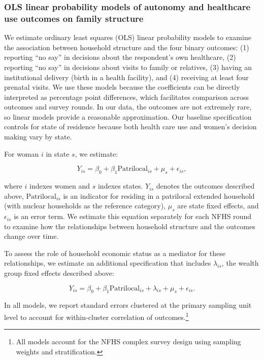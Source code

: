\documentclass[10pt,twoside,reqno]{article}
\begin{document}
\subsubsection*{OLS linear probability models of autonomy and healthcare use outcomes on family structure}

We estimate ordinary least squares (OLS) linear probability models to examine the association between household structure and the four binary outcomes: (1) reporting ``no say'' in decisions about the respondent's own healthcare, (2) reporting ``no say'' in decisions about visits to family or relatives, (3) having an institutional delivery (birth in a health facility), and (4) receiving at least four prenatal visits. We use these models because the coefficients can be directly interpreted as percentage point differences, which facilitates comparison across outcomes and survey rounds. In our data, the outcomes are not extremely rare, so linear models provide a reasonable approximation.  Our baseline specification controls for state of residence because both health care use and women's decision making vary by state.  

For woman $i$ in state $s$, we estimate:

\begin{equation} \label{eq:nocontrols}
Y_{is} = \beta_0 + \beta_1 \text{Patrilocal}_{is} + \mu_s + \epsilon_{is},
\end{equation}

where $i$ indexes women and $s$ indexes states. $Y_{is}$ denotes the outcomes described above, $\text{Patrilocal}_{is}$ is an indicator for residing in a patrilocal extended household (with nuclear households as the reference category), $\mu_s$ are state fixed effects, and $\epsilon_{is}$ is an error term. We estimate this equation separately for each NFHS round to examine how the relationships between household structure and the outcomes change over time.

To assess the role of household economic status as a mediator for these relationships, we estimate an additional specification that includes $\lambda_{is}$, the wealth group fixed effects described above:

\begin{equation} \label{eq:controls}
Y_{is} = \beta_0 + \beta_1 \text{Patrilocal}_{is} + \lambda_{is} + \mu_s + \epsilon_{is}.
\end{equation}

In all models, we report standard errors clustered at the primary sampling unit level to account for within-cluster correlation of outcomes.\footnote{All models account for the NFHS complex survey design using sampling weights and stratification.}
\end{document}
